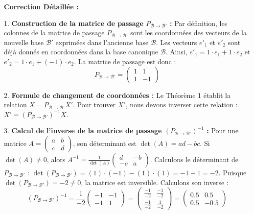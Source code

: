 \documentclass{report}
\begin{document}
\textbf{Correction Détaillée :}

1.  \textbf{Construction de la matrice de passage $P_{\mathcal{B} \to \mathcal{B}'}$ :}
    Par définition, les colonnes de la matrice de passage $P_{\mathcal{B} \to \mathcal{B}'}$ sont les coordonnées des vecteurs de la nouvelle base $\mathcal{B}'$ exprimées dans l'ancienne base $\mathcal{B}$.
    Les vecteurs $e'_1$ et $e'_2$ sont déjà donnés en coordonnées dans la base canonique $\mathcal{B}$.
    Ainsi, $e'_1 = 1 \cdot e_1 + 1 \cdot e_2$ et $e'_2 = 1 \cdot e_1 + (-1) \cdot e_2$.
    La matrice de passage est donc :
    $$P_{\mathcal{B} \to \mathcal{B}'} = \begin{pmatrix} 1 & 1 \\ 1 & -1 \end{pmatrix}$$

2.  \textbf{Formule de changement de coordonnées :}
    Le Théorème 1 établit la relation $X = P_{\mathcal{B} \to \mathcal{B}'} X'$.
    Pour trouver $X'$, nous devons inverser cette relation : $X' = (P_{\mathcal{B} \to \mathcal{B}'})^{-1} X$.

3.  \textbf{Calcul de l'inverse de la matrice de passage $(P_{\mathcal{B} \to \mathcal{B}'})^{-1}$ :}
    Pour une matrice $A = \begin{pmatrix} a & b \\ c & d \end{pmatrix}$, son déterminant est $\det(A) = ad - bc$. Si $\det(A) \ne 0$, alors $A^{-1} = \frac{1}{\det(A)} \begin{pmatrix} d & -b \\ -c & a \end{pmatrix}$.
    Calculons le déterminant de $P_{\mathcal{B} \to \mathcal{B}'}$ :
    $\det(P_{\mathcal{B} \to \mathcal{B}'}) = (1) \cdot (-1) - (1) \cdot (1) = -1 - 1 = -2$.
    Puisque $\det(P_{\mathcal{B} \to \mathcal{B}'}) = -2 \ne 0$, la matrice est inversible.
    Calculons son inverse :
    $$(P_{\mathcal{B} \to \mathcal{B}'})^{-1} = \frac{1}{-2} \begin{pmatrix} -1 & -1 \\ -1 & 1 \end{pmatrix} = \begin{pmatrix} \frac{-1}{-2} & \frac{-1}{-2} \\ \frac{-1}{-2} & \frac{1}{-2} \end{pmatrix} = \begin{pmatrix} 0.5 & 0.5 \\ 0.5 & -0.5 \end{pmatrix}$$
\end{document}
